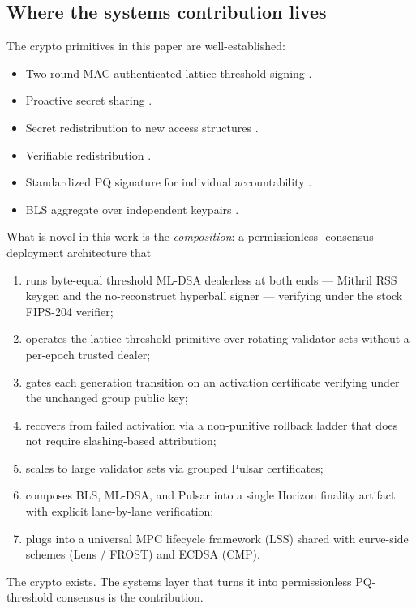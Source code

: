 \subsection{Where the systems contribution lives}

The crypto primitives in this paper are well-established:
\begin{itemize}[leftmargin=2em,nosep]
  \item Two-round MAC-authenticated lattice threshold signing
        \cite{ringtail,thresholdraccoon,hermine}.
  \item Proactive secret sharing \cite{hjky97}.
  \item Secret redistribution to new access structures \cite{desmedtjajodia97}.
  \item Verifiable redistribution \cite{wongwangwing02}.
  \item Standardized PQ signature for individual accountability
        \cite{fips204}.
  \item BLS aggregate over independent keypairs \cite{bls}.
\end{itemize}

What is novel in this work is the \emph{composition}: a permissionless-
consensus deployment architecture that
\begin{enumerate}[leftmargin=2em,nosep]
  \item runs byte-equal threshold ML-DSA dealerless at both ends ---
        Mithril RSS keygen \cite{mithril2026} and the no-reconstruct
        hyperball signer --- verifying under the stock FIPS-204 verifier;
  \item operates the lattice threshold primitive over rotating validator
        sets without a per-epoch trusted dealer;
  \item gates each generation transition on an activation certificate
        verifying under the unchanged group public key;
  \item recovers from failed activation via a non-punitive rollback
        ladder that does not require slashing-based attribution;
  \item scales to large validator sets via grouped Pulsar
        certificates;
  \item composes BLS, ML-DSA, and Pulsar into a single Horizon
        finality artifact with explicit lane-by-lane verification;
  \item plugs into a universal MPC lifecycle framework (LSS) shared
        with curve-side schemes (Lens / FROST) and ECDSA (CMP).
\end{enumerate}

The crypto exists. The systems layer that turns it into permissionless
PQ-threshold consensus is the contribution.
